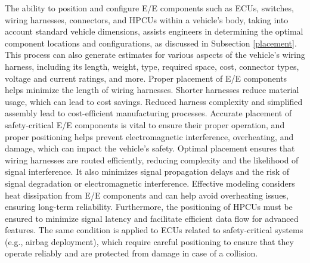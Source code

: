    
     The ability to position and configure E/E components such as ECUs, switches, wiring harnesses, connectors, and HPCUs within a vehicle's body, taking into account standard vehicle dimensions, assists engineers in determining the optimal component locations and configurations, as discussed in Subsection \ref{placement}. This process can also generate estimates for various aspects of the vehicle's wiring harness, including its length, weight, type, required space, cost, connector types, voltage and current ratings, and more.
    Proper placement of E/E components helps minimize the length of wiring harnesses. Shorter harnesses reduce material usage, which can lead to cost savings.
    Reduced harness complexity and simplified assembly lead to cost-efficient manufacturing processes. Accurate placement of safety-critical E/E components is vital to ensure their proper operation, and proper positioning helps prevent electromagnetic interference, overheating, and damage, which can impact the vehicle's safety. Optimal placement ensures that wiring harnesses are routed efficiently, reducing complexity and the likelihood of signal interference.
    It also minimizes signal propagation delays and the risk of signal degradation or electromagnetic interference. Effective modeling considers heat dissipation from E/E components and can help avoid overheating issues, ensuring long-term reliability. Furthermore, the positioning of HPCUs must be ensured to minimize signal latency and facilitate efficient data flow for advanced features. The same condition is applied to ECUs related to safety-critical systems (e.g., airbag deployment), which require careful positioning to ensure that they operate reliably and are protected from damage in case of a collision.
    
    
    
   
